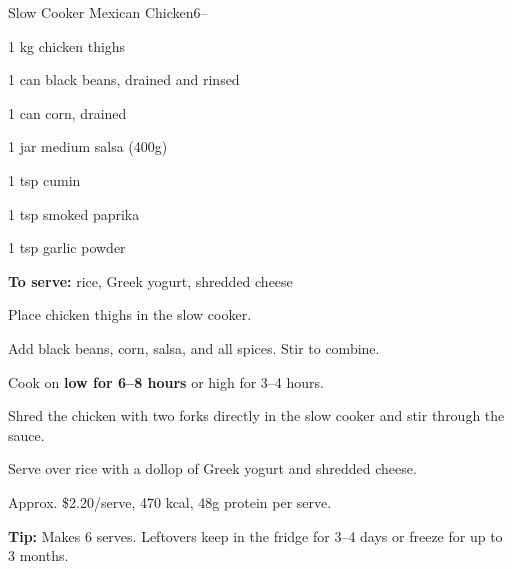 \begin{recipebox}{Slow Cooker Mexican Chicken}{6}{--}
\begin{ingredients}
  \item 1 kg chicken thighs
  \item 1 can black beans, drained and rinsed
  \item 1 can corn, drained
  \item 1 jar medium salsa (400g)
  \item 1 tsp cumin
  \item 1 tsp smoked paprika
  \item 1 tsp garlic powder
  \item \textbf{To serve:} rice, Greek yogurt, shredded cheese
\end{ingredients}

\begin{method}
  \item Place chicken thighs in the slow cooker.
  \item Add black beans, corn, salsa, and all spices. Stir to combine.
  \item Cook on \textbf{low for 6--8 hours} or high for 3--4 hours.
  \item Shred the chicken with two forks directly in the slow cooker and stir through the sauce.
  \item Serve over rice with a dollop of Greek yogurt and shredded cheese.
\end{method}

\begin{notelist}
  \item Approx. \$2.20/serve, 470 kcal, 48g protein per serve.
  \item \textbf{Tip:} Makes 6 serves. Leftovers keep in the fridge for 3--4 days or freeze for up to 3 months.
\end{notelist}
\end{recipebox}
